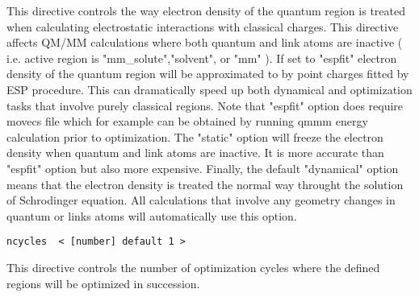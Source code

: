 \begin{itemize}
This directive controls the way electron density of the quantum region is treated when calculating
electrostatic interactions with classical charges. This directive affects QM/MM calculations where both
quantum and link atoms are inactive ( i.e. active region is "mm{\_}solute","solvent", or "mm" ).
If set to "espfit" electron density of the quantum region will be approximated to by point charges
fitted by ESP procedure. This can dramatically speed up both dynamical and optimization tasks that involve purely classical regions.
Note that "espfit" option does require movecs file which for example
can be obtained by running qmmm energy calculation prior to optimization. 
The "static" option will freeze the electron density when quantum and link atoms are inactive. It is more accurate than
"espfit" option but also more expensive. Finally, the default "dynamical" option means that the electron density
is treated the normal way throught the solution of Schrodinger equation. All calculations that involve any geometry
changes in quantum or links atoms will automatically use this option.

\begin{verbatim}
ncycles  < [number] default 1 >
\end{verbatim}

This directive controls the number of optimization cycles where the defined regions will be optimized in succession.

\end{itemize}




